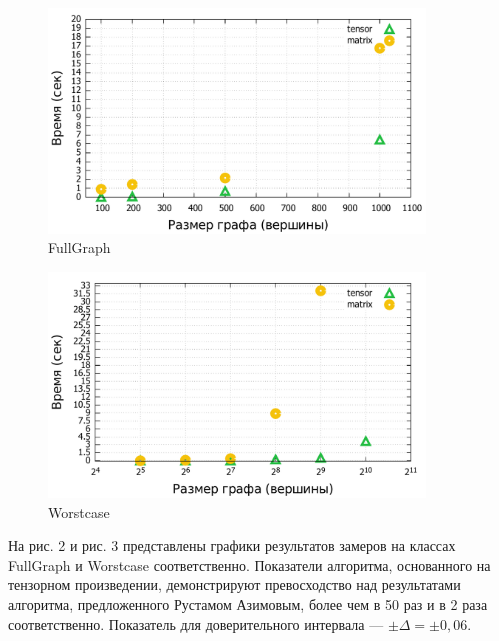 \documentclass[14pt]{matmex-diploma}
\theoremstyle{definition}
\begin{document}
\begin{figure}[h]
\begin{center}
     \includegraphics[width=10cm]{fullgraph.pdf}
     \caption{FullGraph}
\end{center}
\end{figure}
\begin{figure}[h]
\begin{center}
    \includegraphics[width=10cm]{worstcase.pdf}
     \caption{Worstcase}
\end{center}
\end{figure}

На рис. 2 и рис. 3 представлены графики результатов замеров на классах FullGraph и Worstcase соответственно. Показатели алгоритма, основанного на тензорном произведении, демонстрируют превосходство над результатами алгоритма, предложенного Рустамом Азимовым, более чем в 50 раз и в 2 раза соответственно. Показатель для доверительного интервала --- $\pm \Delta = \pm 0,06$.
\end{document}
